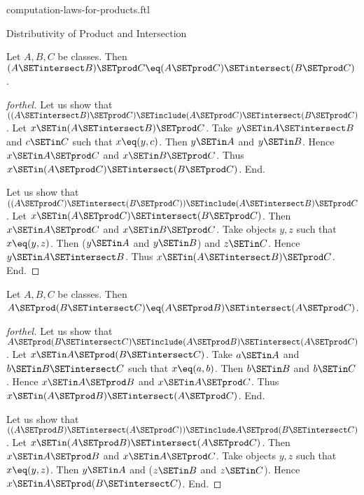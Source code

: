 \documentclass{naproche-library}
\begin{document}
\begin{smodule}[title=Computation Laws for Cartesian Products]{computation-laws-for-products.ftl}
\begin{sfragment}{Distributivity of Product and Intersection}
  \begin{proposition}[forthel,id=FOUNDATIONS_05_1249567930580992]
    Let $A, B, C$ be classes.
    Then $(A \SETintersect B) \SETprod C \eq (A \SETprod C) \SETintersect (B \SETprod C)$.
  \end{proposition}
  \begin{proof}[forthel]
    Let us show that $((A \SETintersect B) \SETprod C) \SETinclude (A \SETprod C) \SETintersect (B \SETprod C)$. %
      Let $x \SETin (A \SETintersect B) \SETprod C$.
      Take $y \SETin A \SETintersect B$ and $c \SETin C$ such that $x \eq (y, c)$.
      Then $y \SETin A$ and $y \SETin B$.
      Hence $x \SETin A \SETprod C$ and $x \SETin B \SETprod C$.
      Thus $x \SETin (A \SETprod C) \SETintersect (B \SETprod C)$.
    End.

    Let us show that $((A \SETprod C) \SETintersect (B \SETprod C)) \SETinclude (A \SETintersect B) \SETprod C$. %
      Let $x \SETin (A \SETprod C) \SETintersect (B \SETprod C)$.
      Then $x \SETin A \SETprod C$ and $x \SETin B \SETprod C$.
      Take objects $y, z$ such that $x \eq (y, z)$.
      Then ($y \SETin A$ and $y \SETin B$) and $z \SETin C$.
      Hence $y \SETin A \SETintersect B$.
      Thus $x \SETin (A \SETintersect B) \SETprod C$.
    End.
  \end{proof}

  \begin{proposition}[forthel,id=FOUNDATIONS_05_954964241285120]
    Let $A, B, C$ be classes.
    Then $A \SETprod (B \SETintersect C) \eq (A \SETprod B) \SETintersect (A \SETprod C)$.
  \end{proposition}
  \begin{proof}[forthel]
    Let us show that $A \SETprod (B \SETintersect C) \SETinclude (A \SETprod B) \SETintersect (A \SETprod C)$.
      Let $x \SETin A \SETprod (B \SETintersect C)$.
      Take $a \SETin A$ and $b \SETin B \SETintersect C$ such that $x \eq (a, b)$.
      Then $b \SETin B$ and $b \SETin C$.
      Hence $x \SETin A \SETprod B$ and $x \SETin A \SETprod C$.
      Thus $x \SETin (A \SETprod B) \SETintersect (A \SETprod C)$.
    End.

    Let us show that $((A \SETprod B) \SETintersect (A \SETprod C)) \SETinclude A \SETprod (B \SETintersect C)$. %
      Let $x \SETin (A \SETprod B) \SETintersect (A \SETprod C)$.
      Then $x \SETin A \SETprod B$ and $x \SETin A \SETprod C$.
      Take objects $y, z$ such that $x \eq (y, z)$.
      Then $y \SETin A$ and ($z \SETin B$ and $z \SETin C$).
      Hence $x \SETin A \SETprod (B \SETintersect C)$.
    End.
  \end{proof}
\end{sfragment}


\end{smodule}
\end{document}
